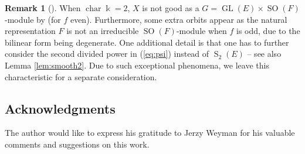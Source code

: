 \documentclass[11pt]{amsart}
\numberwithin{equation}{section}
\theoremstyle{definition}
\newtheorem{rmk}[equation]{Remark}
\newenvironment{remark}[1][]{\begin{rmk}[#1] \pushQED{\qed}}{\popQED \end{rmk}}
\newcommand{\Hom}{\operatorname{Hom}}
\DeclareMathOperator{\GL}{GL}
\DeclareMathOperator{\cha}{char}
\newcommand{\op}{\operatorname}
\newcommand{\kk}{\Bbbk}
\begin{document}
\begin{remark}\label{rem:char2}
When $\cha \kk = 2$, $X$ is not good as a $G = \GL(E)\times \op{SO}(F)$-module by \cite[Example 1.]{hashiinv} (for $f$ even). Furthermore, some extra orbits appear as the natural representation $F$ is not an irreducible $\op{SO}(F)$-module when $f$ is odd, due to the bilinear form being degenerate. One additional detail is that one has to further consider the second divided power in (\ref{eq:psi}) instead of $\op{S}_2(E)$ -- see also Lemma \ref{lem:smooth2}. Due to such exceptional phenomena, we leave this characteristic for a separate consideration.%
\end{remark}

\subsection*{Acknowledgments}
The author would like to express his gratitude to Jerzy Weyman for his valuable comments and suggestions on this work.




\end{document}
